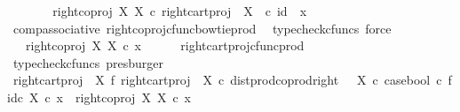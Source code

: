 \begin{isabellebody}
\ \ \isamarkupfalse%
\ \isamarkupfalse%
\ {\isachardoublequoteopen}{\isachardot}{\kern0pt}{\isachardot}{\kern0pt}{\isachardot}{\kern0pt}\ {\isacharequal}{\kern0pt}\ right{\isacharunderscore}{\kern0pt}coproj\ X\ X\ {\isasymcirc}\isactrlsub c\ right{\isacharunderscore}{\kern0pt}cart{\isacharunderscore}{\kern0pt}proj\ {\isasymone}\ X\ \ {\isasymcirc}\isactrlsub c\ {\isasymlangle}id\ {\isasymone}{\isacharcomma}{\kern0pt}\ x{\isasymrangle}{\isachardoublequoteclose}\isanewline
\ \ \ \ \isamarkupfalse%
\ comp{\isacharunderscore}{\kern0pt}associative{}\ right{\isacharunderscore}{\kern0pt}coproj{\isacharunderscore}{\kern0pt}cfunc{\isacharunderscore}{\kern0pt}bowtie{\isacharunderscore}{\kern0pt}prod\ \isamarkupfalse%
\ {\isacharparenleft}{\kern0pt}typecheck{\isacharunderscore}{\kern0pt}cfuncs{\isacharcomma}{\kern0pt}\ force{\isacharparenright}{\kern0pt}\isanewline
\ \ \isamarkupfalse%
\ \isamarkupfalse%
\ {\isachardoublequoteopen}{\isachardot}{\kern0pt}{\isachardot}{\kern0pt}{\isachardot}{\kern0pt}\ {\isacharequal}{\kern0pt}\ right{\isacharunderscore}{\kern0pt}coproj\ X\ X\ {\isasymcirc}\isactrlsub c\ x{\isachardoublequoteclose}\isanewline
\ \ \ \ \isamarkupfalse%
\ right{\isacharunderscore}{\kern0pt}cart{\isacharunderscore}{\kern0pt}proj{\isacharunderscore}{\kern0pt}cfunc{\isacharunderscore}{\kern0pt}prod\ \isamarkupfalse%
\ {\isacharparenleft}{\kern0pt}typecheck{\isacharunderscore}{\kern0pt}cfuncs{\isacharcomma}{\kern0pt}\ presburger{\isacharparenright}{\kern0pt}\isanewline
\ \ \isamarkupfalse%
\ \isamarkupfalse%
\ {\isachardoublequoteopen}{\isacharparenleft}{\kern0pt}{\isacharparenleft}{\kern0pt}right{\isacharunderscore}{\kern0pt}cart{\isacharunderscore}{\kern0pt}proj\ {\isasymone}\ X\ {\isasymbowtie}\isactrlsub f\ right{\isacharunderscore}{\kern0pt}cart{\isacharunderscore}{\kern0pt}proj\ {\isasymone}\ X{\isacharparenright}{\kern0pt}\ {\isasymcirc}\isactrlsub c\ dist{\isacharunderscore}{\kern0pt}prod{\isacharunderscore}{\kern0pt}coprod{\isacharunderscore}{\kern0pt}right\ {\isasymone}\ {\isasymone}\ X\ {\isasymcirc}\isactrlsub c\ {\isasymlangle}case{\isacharunderscore}{\kern0pt}bool\ {\isasymcirc}\isactrlsub c\ f{\isacharcomma}{\kern0pt}id\isactrlsub c\ X{\isasymrangle}{\isacharparenright}{\kern0pt}\ {\isasymcirc}\isactrlsub c\ x\ {\isacharequal}{\kern0pt}\ right{\isacharunderscore}{\kern0pt}coproj\ X\ X\ {\isasymcirc}\isactrlsub c\ x{\isachardoublequoteclose}\isacommand{{\isachardot}{\kern0pt}}\isamarkupfalse%

\end{isabellebody}
